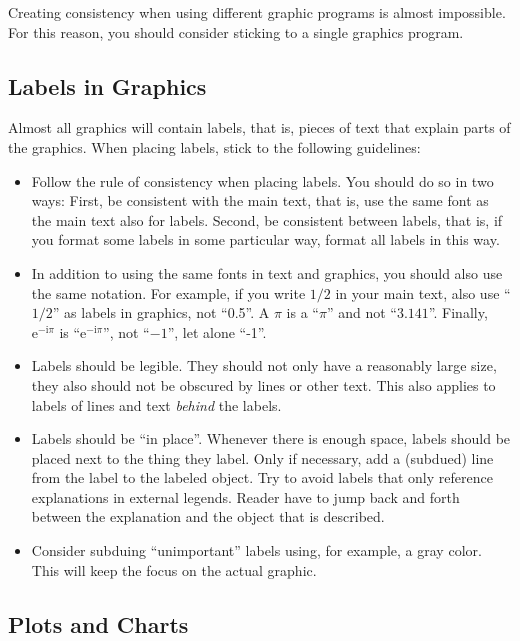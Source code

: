Creating consistency when using different graphic programs is almost
impossible. For this reason, you should consider sticking to a single graphics
program.


\subsection{Labels in Graphics}

Almost all graphics will contain labels, that is, pieces of text that explain
parts of the graphics. When placing labels, stick to the following guidelines:
%
\begin{itemize}
    \item Follow the rule of consistency when placing labels. You should do
        so in two ways: First, be consistent with the main text, that is, use
        the same font as the main text also for labels. Second, be consistent
        between labels, that is, if you format some labels in some particular
        way, format all labels in this way.
    \item In addition to using the same fonts in text and graphics, you
        should also use the same notation. For example, if you write $1/2$ in
        your main text, also use ``$1/2$'' as labels in graphics, not
        ``0.5''. A $\pi$ is a ``$\pi$'' and not ``$3.141$''. Finally,
        $\mathrm e^{-\mathrm i \pi}$ is ``$\mathrm e^{-\mathrm i \pi}$'', not
        ``$-1$'', let alone ``-1''.
    \item Labels should be legible. They should not only have a reasonably
        large size, they also should not be obscured by lines or other text.
        This also applies to labels of lines and text \emph{behind} the
        labels.
    \item Labels should be ``in  place''. Whenever there is enough space,
        labels should be placed next to the thing they label. Only if
        necessary, add a (subdued) line from the label to the labeled object.
        Try to avoid labels that only reference explanations in external
        legends. Reader have to jump back and forth between the explanation and
        the object that is described.
    \item Consider subduing ``unimportant'' labels using, for example, a gray
        color. This will keep the focus on the actual graphic.
\end{itemize}


\subsection{Plots and Charts}

